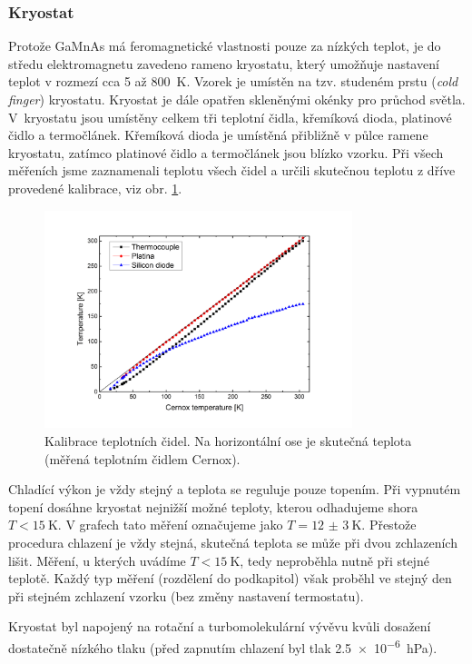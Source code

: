 \subsubsection*{Kryostat}

Protože GaMnAs má feromagnetické vlastnosti pouze za nízkých teplot, je do středu elektromagnetu zavedeno rameno kryostatu, který umožňuje nastavení teplot v rozmezí cca 5 až \SI{800}{\kelvin}. Vzorek je umístěn na tzv. studeném prstu (\emph{cold finger}) kryostatu. Kryostat je dále opatřen skleněnými okénky pro průchod světla. V~kryostatu jsou umístěny celkem tři teplotní čidla, křemíková dioda, platinové čidlo a termočlánek. Křemíková dioda je umístěná přibližně v půlce ramene kryostatu, zatímco platinové čidlo a termočlánek jsou blízko vzorku.
Při všech měřeních jsme zaznamenali teplotu všech čidel a určili skutečnou teplotu z dříve provedené kalibrace, viz obr. \ref{sensor}.

\begin{figure}[htbp]\centering
	\includegraphics[width=0.8\textwidth]{./png/sensorcalibration}
	\caption{Kalibrace teplotních čidel. Na horizontální ose je skutečná teplota (měřená teplotním čidlem Cernox).}\label{sensor}
\end{figure}


Chladící výkon je vždy stejný a teplota se reguluje pouze topením. Při vypnutém topení dosáhne kryostat nejnižší možné teploty, kterou odhadujeme shora $T<\SI{15}{\kelvin}$. V grafech tato měření označujeme jako $T=\SI{12(3)}{\kelvin}$. Přestože procedura chlazení je vždy stejná, skutečná teplota se může při dvou zchlazeních lišit. Měření, u kterých uvádíme $T<\SI{15}{\kelvin}$, tedy neproběhla nutně při stejné teplotě. Každý typ měření (rozdělení do podkapitol) však proběhl ve stejný den při stejném zchlazení vzorku (bez změny nastavení termostatu).

Kryostat byl napojený na rotační a turbomolekulární vývěvu kvůli dosažení dostatečně nízkého tlaku (před zapnutím chlazení byl tlak \SI{2,5e-6}{\hecto\pascal}).